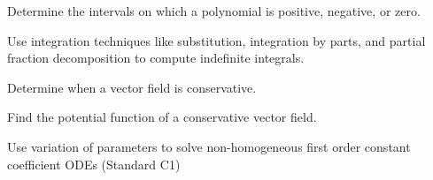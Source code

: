 \begin{readinessAssuranceOutcomes}
\item Determine the intervals on which a polynomial is positive, negative, or zero.
\item Use integration techniques like substitution, integration by parts, and partial fraction decomposition to compute indefinite integrals. 
\item Determine when a vector field is conservative.
\item Find the potential function of a conservative vector field.
\item Use variation of parameters to solve non-homogeneous first order constant coefficient ODEs (Standard C1)
\end{readinessAssuranceOutcomes}
